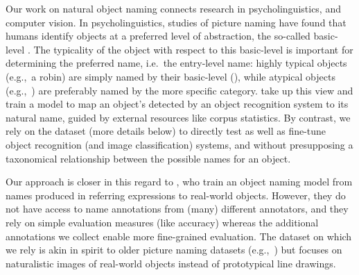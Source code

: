 
%
Our work on natural object naming connects research in psycholinguistics, \langvis and computer vision. In psycholinguistics, studies of picture naming have found that humans identify objects at a preferred level of abstraction, the so-called basic-level \cite{rosch1976basic,jolicoeur1984pictures}. 
The typicality of the object with respect to this basic-level \category is important for determining the preferred name, i.e.\ the entry-level name: highly typical objects (e.g.,\ a robin) are simply named by their basic-level \category (), while atypical objects (e.g.,\ ) are preferably named by the more specific category.
 take up this view and train a model to map an object's \category detected by an object recognition system to its natural name, guided by external resources like corpus statistics.
By contrast, we rely on the \mn dataset (more details below) to directly test as well as fine-tune object recognition (and image classification) systems, and without presupposing a taxonomical relationship between the possible names for an object.

Our approach is closer in this regard to , who train an object naming model from names produced in referring expressions to real-world objects.
However, they do not have access to name annotations from (many) different annotators, and they rely on simple evaluation measures (like accuracy) whereas the additional annotations we collect enable more fine-grained evaluation.
The \mn dataset on which we rely is akin in spirit to older picture naming datasets (e.g.,~) but focuses on naturalistic images of real-world objects instead of prototypical line drawings.

